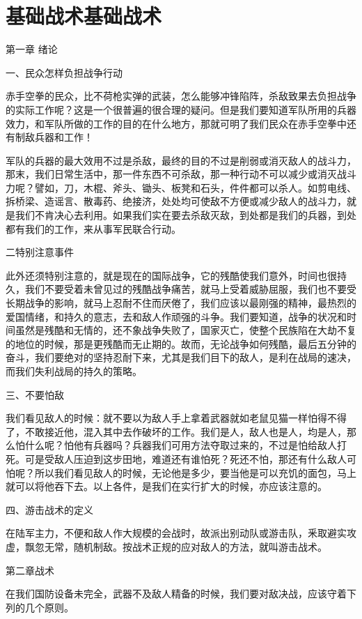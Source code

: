 \section[基础战术基础战术]{基础战术基础战术}


第一章 绪论

一、民众怎样负担战争行动

赤手空拳的民众，比不荷枪实弹的武装，怎么能够冲锋陷阵，杀敌致果去负担战争的实际工作呢？这是一个很普遍的很合理的疑问。但是我们要知道军队所用的兵器效力，和军队所做的工作的目的在什么地方，那就可明了我们民众在赤手空拳中还有制敌兵器和工作！

军队的兵器的最大效用不过是杀敌，最终的目的不过是削弱或消灭敌人的战斗力，那末，我们日常生活中，那一件东西不可杀敌，那一种行动不可以减少或消灭战斗力呢？譬如，刀，木棍、斧头、锄头、板凳和石头，件件都可以杀人。如剪电线、拆桥梁、造谣言、散毒药、绝接济，处处均可使敌不方便或减少敌人的战斗力，就是我们不肯决心去利用。如果我们实在要去杀敌灭敌，到处都是我们的兵器，到处都有我们的工作，来从事军民联合行动。

二特别注意事件

此外还须特别注意的，就是现在的国际战争，它的残酷使我们意外，时间也很持久，我们不要受着未曾见过的残酷战争痛苦，就马上受着威胁屈服，我们也不要受长期战争的影响，就马上忍耐不住而厌倦了，我们应该以最刚强的精神，最热烈的爱国情绪，和持久的意志，去和敌人作顽强的斗争。我们要知道，战争的状况和时间虽然是残酷和无情的，还不象战争失败了，国家灭亡，使整个民族陷在大劫不复的地位的时候，那是更残酷而无止期的。故而，无论战争如何残酷，最后五分钟的奋斗，我们要绝对的坚持忍耐下来，尤其是我们目下的敌人，是利在战局的速决，而我们失利战局的持久的策略。

三、不要怕敌

我们看见敌人的时候：就不要以为敌人手上拿着武器就如老鼠见猫一样怕得不得了，不敢接近他，混入其中去作破坏的工作。我们是人，敌人也是人，均是人，那么怕什么呢？怕他有兵器吗？兵器我们可用方法夺取过来的，不过是怕给敌人打死。可是受敌人压迫到这步田地，难道还有谁怕死？死还不怕，那还有什么敌人可怕呢？所以我们看见敌人的时候，无论他是多少，要当他是可以充饥的面包，马上就可以将他吞下去。以上各件，是我们在实行扩大的时候，亦应该注意的。

四、游击战术的定义

在陆军主力，不便和敌人作大规模的会战时，故派出别动队或游击队，釆取避实攻虚，飘忽无常，随机制敌。按战术正规的应对敌人的方法，就叫游击战术。

第二章战术

在我们国防设备未完全，武器不及敌人精备的时候，我们要对敌决战，应该守着下列的几个原则。

